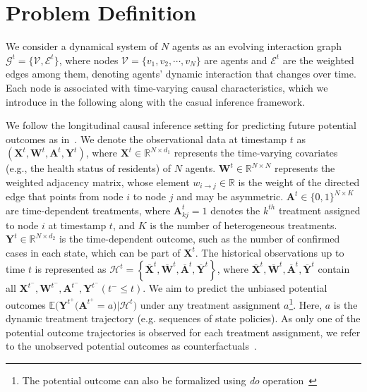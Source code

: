 \section{Problem Definition}\label{sec:problem}
We consider a dynamical system of $N$ agents as an evolving interaction graph $\mathcal{G}^t = \{\mathcal{V},\mathcal{E}^t\}$, where nodes $\mathcal{V} = \{v_1, v_2, \cdots, v_N\}$ are agents and $\mathcal{E}^t$ are the weighted edges among them, denoting agents' dynamic interaction that changes over time. Each node is associated with time-varying causal characteristics, which we introduce in the following along with the casual inference framework.


We follow the longitudinal causal inference setting for predicting future potential outcomes as in~\cite{rubin1978bayesian}.  We denote the observational data at timestamp $t$ as $(\mathbf{X}^t, \mathbf{W}^t, \mathbf{A}^t, \mathbf{Y}^t)$, where $\mathbf{X}^t\in\mathbb{R}^{N\times d_1}$ represents the time-varying covariates (e.g., the health status of residents) of $N$ agents. $\mathbf{W}^t \in \mathbb{R}^{N\times N}$ represents the weighted adjacency matrix, whose element $w_{i\rightarrow j}\in \mathbb{R}$ is the weight of the directed edge that points from node $i$ to node $j$ and may be asymmetric. $\mathbf{A}^t\in \{0,1\}^{N\times K}$ are time-dependent treatments, where $\mathbf{A}_{kj}^t = 1$ denotes the $k^{th}$ treatment assigned to node $i$ at timestamp $t$, and $K$ is the number of heterogeneous treatments.  $\mathbf{Y}^t\in\mathbb{R}^{N\times d_2}$ is the time-dependent outcome, such as the number of confirmed cases in each state, which can be part of $\mathbf{X}^t$. The historical observations up to time $t$ is represented as $\mathcal{H}^t=\left\{\overline{\mathbf{X}}^t, \overline{\mathbf{W}}^t, \overline{\mathbf{A}}^t, \overline{\mathbf{Y}}^t\right\}$, where $\overline{\mathbf{X}}^t, \overline{\mathbf{W}}^t, \overline{\mathbf{A}}^t, \overline{\mathbf{Y}}^t$ contain all $\mathbf{X}^{t^-},\mathbf{W}^{t^-},\mathbf{A}^{t^-},\mathbf{Y}^{t^-}\left(t^{-} \leq t\right)$. 
We aim to predict the unbiased potential outcomes $\mathbb{E}\big(\mathbf{Y}^{t^{+}}\big(\mathbf{A}^{t^{+}}=a\big)|\mathcal{H}^t\big)$ under any treatment assignment $a$\footnote{The potential outcome can also be formalized using \textit{do} operation~\cite{pearl2009causality}}. Here, $a$ is the dynamic treatment trajectory (e.g. sequences of state policies). As only one of the potential outcome trajectories is observed for each treatment assignment, we refer to the unobserved potential outcomes as counterfactuals~\cite{BicaAJS20,seedat2022continuous}.

